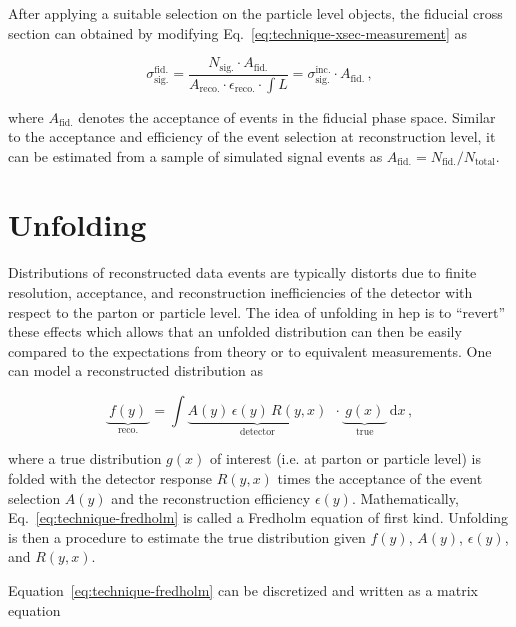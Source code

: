 After applying a suitable selection on the particle level objects, the fiducial cross section can obtained by modifying Eq.~\ref{eq:technique-xsec-measurement} as

\begin{equation}
\sigma_\mathrm{sig.}^\mathrm{fid.}=\frac{N_\mathrm{sig.}\cdot A_\mathrm{fid.}}{A_\mathrm{reco.}\cdot\epsilon_\mathrm{reco.}\cdot{\textstyle{\int}L}} =\sigma_\mathrm{sig.}^\mathrm{inc.}\cdot A_\mathrm{fid.}\,,
\end{equation}

where $A_\mathrm{fid.}$ denotes the acceptance of events in the fiducial phase space. Similar to the acceptance and efficiency of the event selection at reconstruction level, it can be estimated from a sample of simulated signal events as $A_\mathrm{fid.}=N_\mathrm{fid.}/N_\mathrm{total}$. 



\section{Unfolding}

Distributions of reconstructed data events are typically distorts due to finite resolution, acceptance, and reconstruction inefficiencies of the detector with respect to the parton or particle level. The idea of unfolding in \gls{hep} is to ``revert'' these effects which allows that an unfolded distribution can then be easily compared to the expectations from theory or to equivalent measurements. One can model a reconstructed distribution as

\begin{equation}
\underbrace{~f(y)~}_\mathrm{reco.}=\int \underbrace{A(y)\,\epsilon(y)\, R(y,x)}_\mathrm{detector}~~\cdot \underbrace{~g(x)~}_\mathrm{true}\, \mathrm{d}x\,, \label{eq:technique-fredholm}
\end{equation}

where a true distribution $g(x)$ of interest (i.e. at parton or particle level) is folded with the detector response $R(y,x)$ times the acceptance of the event selection $A(y)$ and the reconstruction efficiency $\epsilon(y)$. Mathematically, Eq.~\ref{eq:technique-fredholm} is called a Fredholm equation of first kind. Unfolding is then a procedure to estimate the true distribution given $f(y)$, $A(y)$, $\epsilon(y)$, and $R(y,x)$. 

Equation~\ref{eq:technique-fredholm} can be discretized and written as a matrix equation

